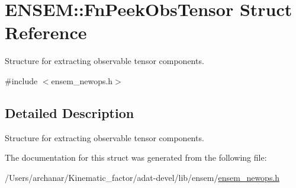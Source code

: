\hypertarget{structENSEM_1_1FnPeekObsTensor}{}\section{E\+N\+S\+EM\+:\+:Fn\+Peek\+Obs\+Tensor Struct Reference}
\label{structENSEM_1_1FnPeekObsTensor}


Structure for extracting observable tensor components.  




{\ttfamily \#include $<$ensem\+\_\+newops.\+h$>$}



\subsection{Detailed Description}
Structure for extracting observable tensor components. 

The documentation for this struct was generated from the following file\+:\begin{DoxyCompactItemize}
\item 
/\+Users/archanar/\+Kinematic\+\_\+factor/adat-\/devel/lib/ensem/\mbox{\hyperlink{adat-devel_2lib_2ensem_2ensem__newops_8h}{ensem\+\_\+newops.\+h}}\end{DoxyCompactItemize}
